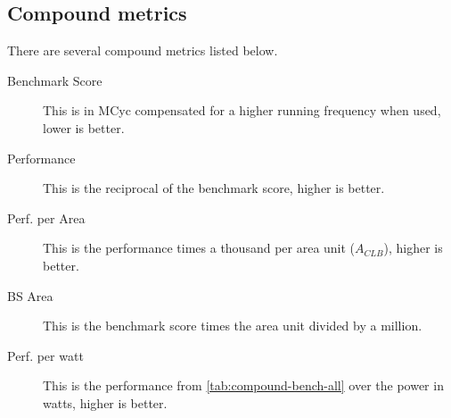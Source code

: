 \documentclass[final]{article}
\begin{document}
\subsection{Compound metrics}
\label{ssec:compound-metrics}
There are several compound metrics listed below.
\begin{description}

    \item[Benchmark Score] This is in MCyc compensated for a higher running frequency when used, lower is better.
    \item[Performance] This is the reciprocal of the benchmark score, higher is better.
    \item[Perf. per Area] This is the performance times a thousand per area unit ($A_{CLB}$), higher is better.
    \item[BS Area] This is the benchmark score times the area unit divided by a million.
    \item[Perf. per watt] This is the performance from \cref{tab:compound-bench-all} over the power in watts, higher is better.

\end{description}
\end{document}
